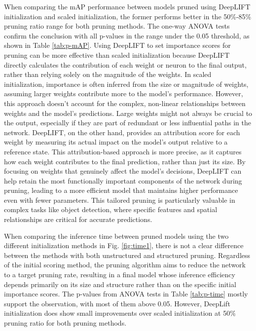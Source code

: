 \documentclass[journal,onecolumn,12pt]{IEEEtran}
\begin{document}
When comparing the mAP performance between models pruned using DeepLIFT initialization and scaled initialization, the former performs better in the 50\%-85\% pruning ratio range for both pruning methods. The one-way ANOVA tests confirm the conclusion with all p-values in the range under the 0.05 threshold, as shown in Table \ref{tab:p-mAP}. Using DeepLIFT to set importance scores for pruning can be more effective than scaled initialization because DeepLIFT directly calculates the contribution of each weight or neuron to the final output, rather than relying solely on the magnitude of the weights. In scaled initialization, importance is often inferred from the size or magnitude of weights, assuming larger weights contribute more to the model’s performance. However, this approach doesn’t account for the complex, non-linear relationships between weights and the model's predictions. Large weights might not always be crucial to the output, especially if they are part of redundant or less influential paths in the network. DeepLIFT, on the other hand, provides an attribution score for each weight by measuring its actual impact on the model’s output relative to a reference state. This attribution-based approach is more precise, as it captures how each weight contributes to the final prediction, rather than just its size. By focusing on weights that genuinely affect the model’s decisions, DeepLIFT can help retain the most functionally important components of the network during pruning, leading to a more efficient model that maintains higher performance even with fewer parameters. This tailored pruning is particularly valuable in complex tasks like object detection, where specific features and spatial relationships are critical for accurate predictions.

When comparing the inference time between pruned models using the two different initialization methods in Fig. \ref{fig:time1}, there is not a clear difference between the methods with both unstructured and structured pruning. Regardless of the initial scoring method, the pruning algorithm aims to reduce the network to a target pruning rate, resulting in a final model whose inference efficiency depends primarily on its size and structure rather than on the specific initial importance scores. The p-values from ANOVA tests in Table \ref{tab:p-time} mostly support the observation, with most of them above 0.05. However, DeepLift initialization does show small improvements over scaled initialization at 50\% pruning ratio for both pruning methods. 
\end{document}
